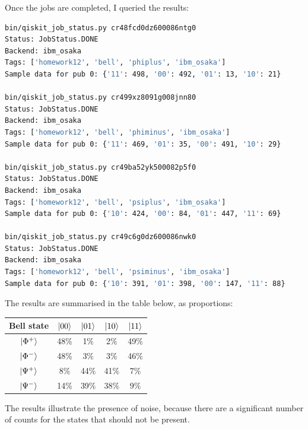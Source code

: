 \documentclass[12pt]{extarticle}
\begin{document}
\begin{enumerate}[(a)]
Once the jobs are completed, I queried the results:
\begin{lstlisting}[language=bash]
bin/qiskit_job_status.py cr48fcd0dz600086ntg0
Status: JobStatus.DONE
Backend: ibm_osaka
Tags: ['homework12', 'bell', 'phiplus', 'ibm_osaka']
Sample data for pub 0: {'11': 498, '00': 492, '01': 13, '10': 21}

bin/qiskit_job_status.py cr499xz8091g008jnn80
Status: JobStatus.DONE
Backend: ibm_osaka
Tags: ['homework12', 'bell', 'phiminus', 'ibm_osaka']
Sample data for pub 0: {'11': 469, '01': 35, '00': 491, '10': 29}

bin/qiskit_job_status.py cr49ba52yk500082p5f0
Status: JobStatus.DONE
Backend: ibm_osaka
Tags: ['homework12', 'bell', 'psiplus', 'ibm_osaka']
Sample data for pub 0: {'10': 424, '00': 84, '01': 447, '11': 69}

bin/qiskit_job_status.py cr49c6g0dz600086nwk0
Status: JobStatus.DONE
Backend: ibm_osaka
Tags: ['homework12', 'bell', 'psiminus', 'ibm_osaka']
Sample data for pub 0: {'10': 391, '01': 398, '00': 147, '11': 88}
\end{lstlisting}

The results are summarised in the table below, as proportions:
\begin{center}
\begin{tabular}{|c|c|c|c|c|}
\hline
Bell state & $\ket{00}$ & $\ket{01}$ & $\ket{10}$ & $\ket{11}$ \\
\hline
$\ket{\Phi^{+}}$ & 48\% &  1\% &  2\% & 49\% \\
$\ket{\Phi^{-}}$ & 48\% &  3\% &  3\% & 46\% \\
$\ket{\Psi^{+}}$ &  8\% & 44\% & 41\% &  7\% \\
$\ket{\Psi^{-}}$ & 14\% & 39\% & 38\% &  9\% \\
\hline
\end{tabular}
\end{center}

The results illustrate the presence of noise, because there are a significant number of counts for the states that should not be present.




\end{enumerate}
\end{document}
